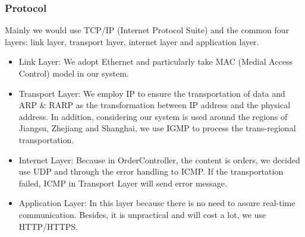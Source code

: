 \documentclass[12pt]{scrreprt}
\begin{document}
\subsubsection{Protocol}
Mainly we would use TCP/IP (Internet Protocol Suite) and the common four layers: link layer, transport layer, internet layer and application layer.\\
\begin{itemize}
	\item Link Layer: We adopt Ethernet and particularly take MAC (Medial Access Control) model in our system.
	\item Transport Layer: We employ IP to ensure the transportation of data and ARP \& RARP as the transformation between IP address and the physical address. In addition, considering our system is used around the regions of Jiangsu, Zhejiang and Shanghai, we use IGMP to process the trans-regional transportation.
	\item Internet Layer: Because in OrderController, the content is orders, we decided use UDP and through the error handling to ICMP. If the transportation failed, ICMP in Transport Layer will send error message.
	\item Application Layer: In this layer because there is no need to assure real-time communication. Besides, it is unpractical and will cost a lot, we use HTTP/HTTPS.	
\end{itemize}
\end{document}
